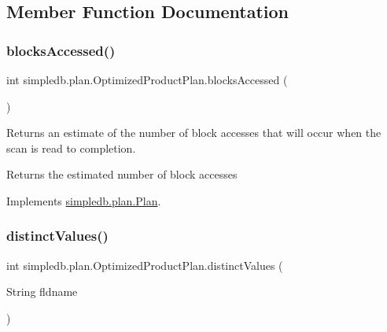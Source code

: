\subsection{Member Function Documentation}
\mbox{\label{classsimpledb_1_1plan_1_1OptimizedProductPlan_a52b0ca647203a27b037e001abda794ae}} 
\subsubsection{\texorpdfstring{blocks\+Accessed()}{blocksAccessed()}}
{\footnotesize\ttfamily int simpledb.\+plan.\+Optimized\+Product\+Plan.\+blocks\+Accessed (\begin{DoxyParamCaption}{ }\end{DoxyParamCaption})\hspace{0.3cm}{\ttfamily [inline]}}

Returns an estimate of the number of block accesses that will occur when the scan is read to completion. \begin{DoxyReturn}{Returns}
the estimated number of block accesses 
\end{DoxyReturn}


Implements \hyperlink{interfacesimpledb_1_1plan_1_1Plan_a6a333b95b956fe224812155b9d1c8202}{simpledb.\+plan.\+Plan}.

\mbox{\label{classsimpledb_1_1plan_1_1OptimizedProductPlan_a53c2cbca815961d5349736f735fa2a0b}} 
\subsubsection{\texorpdfstring{distinct\+Values()}{distinctValues()}}
{\footnotesize\ttfamily int simpledb.\+plan.\+Optimized\+Product\+Plan.\+distinct\+Values (\begin{DoxyParamCaption}\item[{String}]{fldname }\end{DoxyParamCaption})\hspace{0.3cm}{\ttfamily [inline]}}

